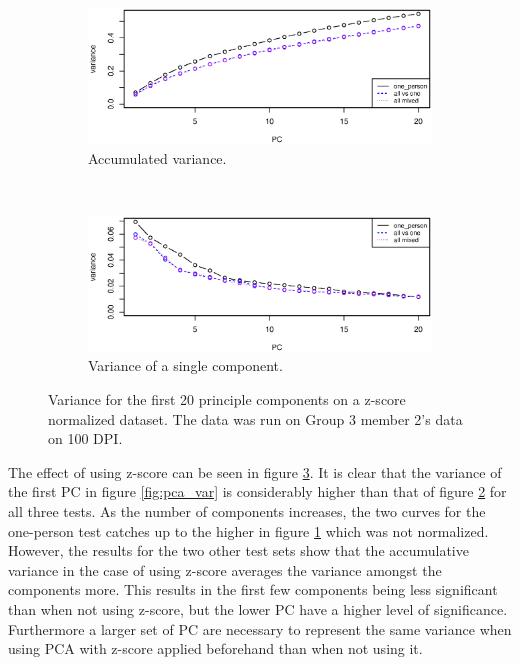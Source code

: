 \begin{figure}[H]
\centering
\begin{subfigure}{0.70\textwidth}
\centering
\includegraphics[width=\textwidth]{graphics/pca_acc_variance_zs}
\caption{Accumulated variance.}
\label{fig:pca_accumulated_var_zscore}
\end{subfigure}\\[-1cm]
\begin{subfigure}{0.70\textwidth}
\centering
\includegraphics[width=\textwidth]{graphics/pca_variance_zs}
\caption{Variance of a single component.}
\label{fig:pca_var_zscore}
\end{subfigure}
\caption[PCA variance when data is normalized using z-score.]{Variance for the first 20 principle components on a z-score normalized dataset.
The data was run on Group 3 member 2's data on 100 DPI. }
\label{fig:variance_zscore}
\end{figure}



The effect of using z-score can be seen in figure \ref{fig:variance_zscore}.
It is clear that the variance of the first PC in figure \ref{fig:pca_var} is considerably higher than that of figure \ref{fig:pca_var_zscore} for all three tests.
As the number of components increases, the two curves for the one-person test catches up to the higher in figure \ref{fig:pca_accumulated_var_zscore} which was not normalized.
However, the results for the two other test sets show that the accumulative variance in the case of using z-score averages the variance amongst the components more.
This results in the first few components being less significant than when not using z-score, but the lower PC have a higher level of significance.
Furthermore a larger set of PC are necessary to represent the same variance when using PCA with z-score applied beforehand than when not using it.



